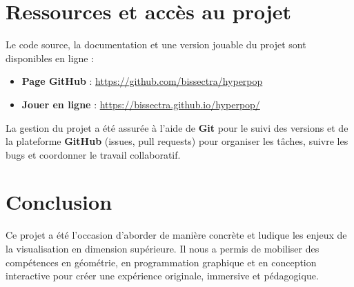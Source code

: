 \documentclass[11pt,a4paper]{article}
\begin{document}
\section{Ressources et accès au projet}

Le code source, la documentation et une version jouable du projet sont disponibles en ligne :
\begin{itemize}
    \item \textbf{Page GitHub} : \url{https://github.com/bissectra/hyperpop}
    \item \textbf{Jouer en ligne} : \url{https://bissectra.github.io/hyperpop/}
\end{itemize}

La gestion du projet a été assurée à l'aide de \textbf{Git} pour le suivi des versions et de la plateforme \textbf{GitHub} (issues, pull requests) pour organiser les tâches, suivre les bugs et coordonner le travail collaboratif.

\section{Conclusion}

Ce projet a été l’occasion d’aborder de manière concrète et ludique les enjeux de la visualisation en dimension supérieure. Il nous a permis de mobiliser des compétences en géométrie, en programmation graphique et en conception interactive pour créer une expérience originale, immersive et pédagogique.
\end{document}
